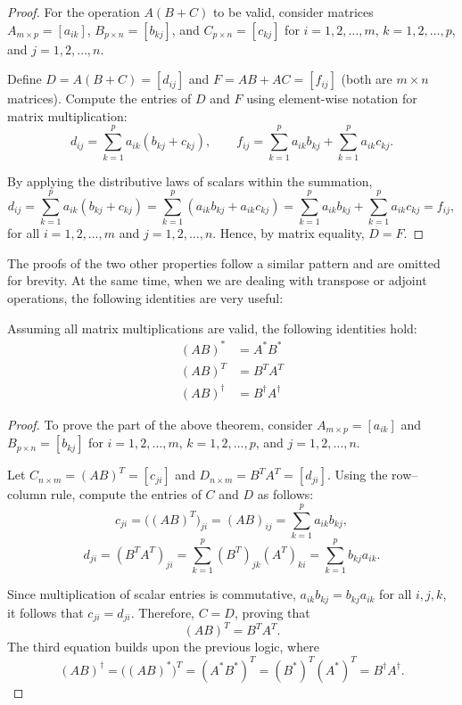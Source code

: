 \documentclass[12pt]{article}
\begin{document}
\begin{proof}
    For the operation $A(B + C)$ to be valid, consider matrices
    $A_{m \times p} = [a_{ik}]$, $B_{p \times n} = [b_{kj}]$, and
    $C_{p \times n} = [c_{kj}]$ for $i = 1,2,\ldots,m$, $k = 1,2,\ldots,p$, and
    $j = 1,2,\ldots,n$.

    Define $D = A(B + C) = [d_{ij}]$ and $F = AB + AC = [f_{ij}]$
    (both are $m \times n$ matrices). Compute the entries of $D$ and $F$
    using element-wise notation for matrix multiplication:
    \[
        d_{ij} = \sum_{k=1}^{p} a_{ik} (b_{kj} + c_{kj}), \qquad
        f_{ij} = \sum_{k=1}^{p} a_{ik} b_{kj} + \sum_{k=1}^{p} a_{ik} c_{kj}.
    \]

    By applying the distributive laws of scalars within the summation,
    \[
        d_{ij}
        = \sum_{k=1}^{p} a_{ik} (b_{kj} + c_{kj})
        = \sum_{k=1}^{p} (a_{ik} b_{kj} + a_{ik} c_{kj})
        = \sum_{k=1}^{p} a_{ik} b_{kj} + \sum_{k=1}^{p} a_{ik} c_{kj}
        = f_{ij},
    \]
    for all $i = 1,2,\ldots,m$ and $j = 1,2,\ldots,n$. Hence, by matrix
    equality, $D = F$. 
\end{proof}

The proofs of the two other properties follow a similar pattern and are omitted for brevity. At the same time, when we are dealing with transpose or adjoint operations, the following identities are very useful:

\begin{theorem}
    Assuming all matrix multiplications are valid, the following identities hold:
    \begin{align*}
        (AB)^* &= A^* B^* \\
        (AB)^T &= B^T A^T \\
        (AB)^\dagger &= B^\dagger A^\dagger
    \end{align*}
\end{theorem}

\begin{proof}
    To prove the part of the above theorem, consider $A_{m \times p} = [a_{ik}]$ and
    $B_{p \times n} = [b_{kj}]$ for $i = 1,2,\ldots,m$, $k = 1,2,\ldots,p$, and
    $j = 1,2,\ldots,n$.

    Let $C_{n \times m} = (AB)^{T} = [c_{ji}]$ and
    $D_{n \times m} = B^{T} A^{T} = [d_{ji}]$. Using the row–column rule, compute
    the entries of $C$ and $D$ as follows:
    \[
        c_{ji} = \bigl((AB)^{T}\bigr)_{ji}
        = (AB)_{ij}
        = \sum_{k=1}^{p} a_{ik} b_{kj},
    \]
    \[
        d_{ji} = (B^{T} A^{T})_{ji}
        = \sum_{k=1}^{p} (B^{T})_{jk} (A^{T})_{ki}
        = \sum_{k=1}^{p} b_{kj} a_{ik}.
    \]

    Since multiplication of scalar entries is commutative,
    $a_{ik} b_{kj} = b_{kj} a_{ik}$ for all $i,j,k$, it follows that
    $c_{ji} = d_{ji}$. Therefore, $C = D$, proving that
    \[
        (AB)^{T} = B^{T} A^{T}.
    \]
    The third equation builds upon the previous logic, where
    \[
    (AB)^{\dagger}
    = \bigl((AB)^{*}\bigr)^{T}
    = (A^{*} B^{*})^{T}
    = (B^{*})^{T} (A^{*})^{T}
    = B^{\dagger} A^{\dagger}.
    \]
\end{proof}
\end{document}
